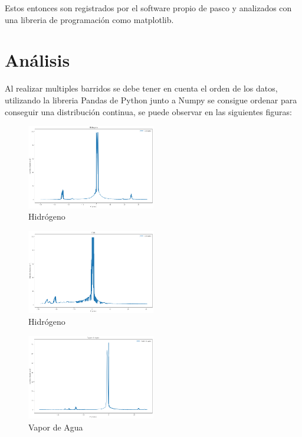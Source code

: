\documentclass[a4paper,twocolumn,10pt]{article}
\begin{document}
Estos entonces son registrados por el software propio de pasco y analizados con una libreria de programación como matplotlib.


\section{Análisis}
Al realizar multiples barridos se debe tener en cuenta el orden de los datos, utilizando la libreria Pandas de Python junto a Numpy se consigue ordenar para conseguir una distribución continua, se puede observar en las siguientes figuras:

\begin{figure}[H]
    \centering
    \includegraphics[width=0.5\textwidth]{Plots/Hidrogeno.png}
    \caption{Hidrógeno}
    \label{fig:my_label}
\end{figure}

\begin{figure}[H]
    \centering
    \includegraphics[width=0.5\textwidth]{Plots/Helio.png}
    \caption{Hidrógeno}
    \label{fig:my_label}
\end{figure}

\begin{figure}[H]
    \centering
    \includegraphics[width=0.5\textwidth]{Plots/Vapor de Awa.png}
    \caption{Vapor de Agua}
    \label{fig:my_label}
\end{figure}
\end{document}
